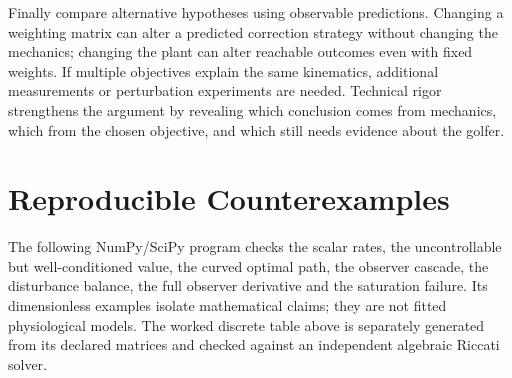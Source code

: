 Finally compare alternative hypotheses using observable predictions. Changing a weighting matrix can alter a predicted correction strategy without changing the mechanics; changing the plant can alter reachable outcomes even with fixed weights. If multiple objectives explain the same kinematics, additional measurements or perturbation experiments are needed. Technical rigor strengthens the argument by revealing which conclusion comes from mechanics, which from the chosen objective, and which still needs evidence about the golfer.

\section{Reproducible Counterexamples}

The following NumPy/SciPy program checks the scalar rates, the uncontrollable but well-conditioned value, the curved optimal path, the observer cascade, the disturbance balance, the full observer derivative and the saturation failure. Its dimensionless examples isolate mathematical claims; they are not fitted physiological models. The worked discrete table above is separately generated from its declared matrices and checked against an independent algebraic Riccati solver.

